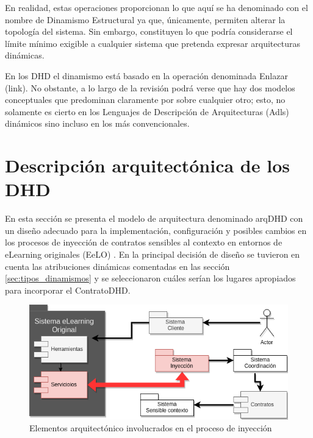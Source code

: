 En realidad, estas operaciones proporcionan lo que aquí se ha denominado con el nombre de Dinamismo Estructural ya que, únicamente, permiten alterar la topología
del sistema. Sin embargo, constituyen lo que podría considerarse el límite
mínimo exigible a cualquier sistema que pretenda expresar arquitecturas dinámicas. 

En los DHD el dinamismo está basado en la operación denominada Enlazar (link). No obstante, a lo largo de la revisión podrá verse que hay dos modelos conceptuales que predominan claramente por sobre cualquier otro; esto, no solamente es
cierto en los Lenguajes de Descripción de Arquitecturas (Adls) dinámicos sino incluso en los más convencionales. 


\section{Descripción arquitectónica de los DHD} \label{secc:arqDHD}

En esta sección se presenta el modelo de arquitectura denominado arqDHD con un diseño adecuado para la implementación, configuración y posibles cambios en los procesos de inyección de contratos sensibles al contexto en entornos de eLearning originales (EeLO) \label{EeLO}. En la principal decisión de diseño se tuvieron en cuenta las atribuciones dinámicas comentadas en las sección \ref{sec:tipos_dinamismos} y se seleccionaron cuáles serían los lugares apropiados para incorporar el ContratoDHD. 


\begin{figure}
\begin{center}
 \includegraphics[scale=0.55]{Ch2/ArqDHD2.png}
\caption{Elementos arquitectónico involucrados en el proceso de inyección} \label{fig:arqDHD1}
\end{center}
\end{figure} 


